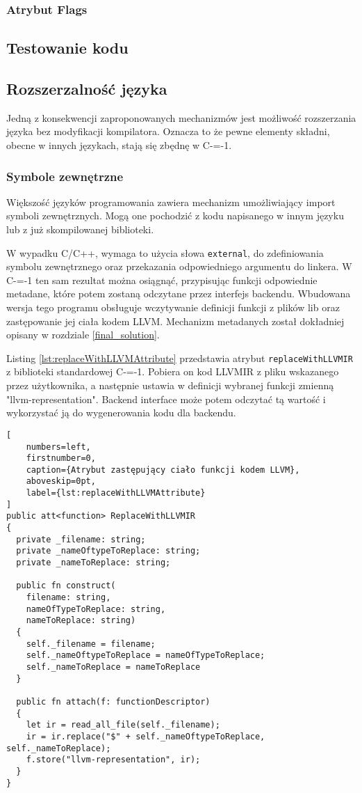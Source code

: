 \subsubsection{Atrybut Flags}

\subsection{Testowanie kodu}

\subsection{Rozszerzalność języka}
Jedną z konsekwencji zaproponowanych mechanizmów jest możliwość rozszerzania języka bez modyfikacji kompilatora.
Oznacza to że pewne elementy składni, obecne w innych językach, stają się zbędnę w C-=-1.
\subsubsection{Symbole zewnętrzne}
Większość języków programowania zawiera mechanizm umożliwiający import symboli zewnętrznych.
Mogą one pochodzić z kodu napisanego w innym języku lub z już skompilowanej biblioteki.

W wypadku C/C++, wymaga to użycia słowa \lstinline{external}, do zdefiniowania symbolu zewnętrznego oraz przekazania odpowiedniego argumentu do linkera.
W C-=-1 ten sam rezultat można osiągnąć, przypisując funkcji odpowiednie metadane, które potem zostaną odczytane przez interfejs backendu.
Wbudowana wersja tego programu obsługuje wczytywanie definicji funkcji z plików lib oraz zastępowanie jej ciała kodem LLVM.
Mechanizm metadanych został dokładniej opisany w rozdziale \ref{final_solution}.

Listing \ref{lst:replaceWithLLVMAttribute} przedstawia atrybut \lstinline{replaceWithLLVMIR} z biblioteki standardowej C-=-1. 
Pobiera on kod LLVMIR z pliku wskazanego przez użytkownika, a następnie ustawia w definicji wybranej funkcji zmienną "llvm-representation".
Backend interface może potem odczytać tą wartość i wykorzystać ją do wygenerowania kodu dla backendu.


\begin{lstlisting}[
    numbers=left,
    firstnumber=0,
    caption={Atrybut zastępujący ciało funkcji kodem LLVM},
    aboveskip=0pt,
    label={lst:replaceWithLLVMAttribute}
]
public att<function> ReplaceWithLLVMIR
{
  private _filename: string;
  private _nameOftypeToReplace: string;
  private _nameToReplace: string;

  public fn construct(
    filename: string,
    nameOfTypeToReplace: string,
    nameToReplace: string)
  {
    self._filename = filename;
    self._nameOftypeToReplace = nameOfTypeToReplace;
    self._nameToReplace = nameToReplace
  }

  public fn attach(f: functionDescriptor)
  {
    let ir = read_all_file(self._filename);
    ir = ir.replace("$" + self._nameOftypeToReplace, self._nameToReplace);
    f.store("llvm-representation", ir);
  }
}

\end{lstlisting}
